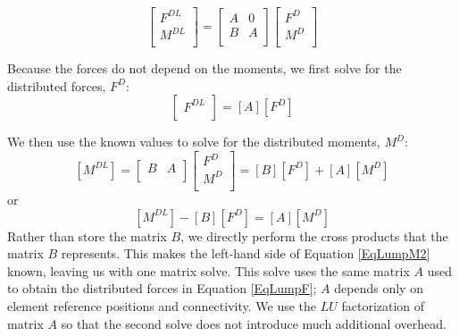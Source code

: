 \documentclass[10pt,letterpaper,oneside,notitlepage]{article}
\begin{document}
\begin{equation}
\label{EqLump}
   \begin{bmatrix}
   F^{DL} \\
   M^{DL} \\
   \end{bmatrix}
=
   \begin{bmatrix}
      A & 0 \\
      B & A \\   
   \end{bmatrix}
   \begin{bmatrix}
   F^{D} \\
   M^{D} \\
   \end{bmatrix}
\end{equation}

Because the forces do not depend on the moments, we first solve for the distributed forces, $F^D$:
\begin{equation}
\label{EqLumpF}
   \begin{bmatrix}   F^{DL} \\   \end{bmatrix}
=
   \left[      A    \right]
   \left[   F^{D}  \right]
\end{equation}

We then use the known values to solve for the distributed moments, $M^D$:
\begin{equation}
\label{EqLumpM1}
   \left[   M^{DL} \right]
=
   \begin{bmatrix} B & A \\   \end{bmatrix}
   \begin{bmatrix}
   F^{D} \\
   M^{D} \\
   \end{bmatrix}
= \left[   B \right] \left[   F^D \right] + \left[   A \right] \left[   M^D \right] 
\end{equation}
or
\begin{equation}
\label{EqLumpM2}
\left[   M^{DL} \right] - \left[   B \right] \left[   F^D \right] = \left[   A \right] \left[   M^D \right]
\end{equation}
Rather than store the matrix $B$, we directly perform the cross products that the matrix $B$ represents.
This makes the left-hand side of Equation \ref{EqLumpM2} known, leaving us with one matrix solve. This 
solve uses the same matrix $A$ used to obtain the distributed forces in Equation \ref{EqLumpF}; $A$ depends 
only on element reference positions and connectivity. We use 
the $LU$ factorization of matrix $A$ so that the second solve does not introduce much additional overhead.
\end{document}
